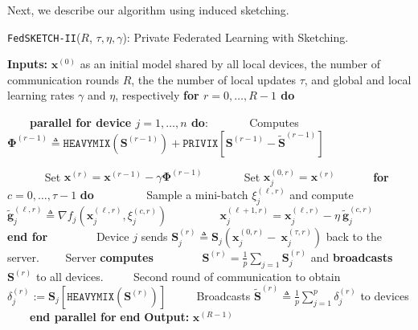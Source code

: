 Next, we describe our algorithm using induced sketching.






\begin{algorithm}[H]
\caption{\texttt{FedSKETCH-II}($R$, $\tau, \eta, \gamma$): Private Federated Learning with Sketching. }\label{Alg:PFLHom}
\begin{algorithmic}[1]
\State \textbf{Inputs:} $\boldsymbol{x}^{(0)}$ as an initial  model shared by all local devices, the number of communication rounds $R$, the the number of local updates $\tau$, and global and local learning rates $\gamma$ and $\eta$, respectively
\State \textbf{for $r=0, \ldots, R-1$ do}

\State $\qquad$\textbf{parallel for device $j=1,\ldots,n$ do}:
\State $\qquad\quad$ Computes ${\mathbf{\Phi}}^{(r-1)}\triangleq \texttt{HEAVYMIX}(\mathbf{S}^{(r-1)})+\texttt{PRIVIX}\left[{\mathbf{S}}^{(r-1)}- \tilde{\mathbf{S}}^{(r-1)}\right]$


\State $\qquad\quad$ Set $\boldsymbol{x}^{(r)}=\boldsymbol{x}^{(r-1)}-\gamma{\mathbf{\Phi}}^{(r-1)}$
\State $\qquad\quad$ Set $\boldsymbol{x}_j^{(0,r)}=\boldsymbol{x}^{(r)}$ 
\State $\qquad\quad $\textbf{for} $c=0,\ldots,\tau-1$ \textbf{do}
\State $\qquad\quad\quad$ Sample a mini-batch $\xi_j^{(\ell,r)}$ and compute $\tilde{\mathbf{g}}_{j}^{(\ell,r)}\triangleq\nabla{f}_j(\boldsymbol{x}^{(\ell,r)}_j,\xi_j^{(c,r)})$
\State $\qquad\quad\quad$ $\boldsymbol{x}^{(\ell+1,r)}_{j}=\boldsymbol{x}^{(\ell,r)}_j-\eta~ \tilde{\mathbf{g}}_{j}^{(c,r)}$ \label{eq:update-rule-alg}
\State $\qquad\quad$\textbf{end for}
\State $\qquad\quad\quad$Device $j$ sends $\mathbf{S}^{(r)}_{j}\triangleq\mathbf{S}_{j}\left(\boldsymbol{x}_j^{(0,r)}-~{\boldsymbol{x}}_{j}^{(\tau,r)}\right)$ back to the server.
\State $\qquad$Server \textbf{computes} 
\State $\qquad\qquad {\mathbf{S}}^{(r)}=\frac{1}{p}\sum_{j=1}\mathbf{S}^{(r)}_{j}$ and \textbf{broadcasts} ${\mathbf{S}}^{(r)}$ to all devices.
\State $\qquad$ Second round of communication to obtain $\delta_j^{(r)} :=  \mathbf{S}_j\left[\texttt{HEAVYMIX}(\mathbf{S}^{(r)})\right]$ 
\State $\qquad$ Broadcasts $\tilde{\mathbf{S}}^{(r)}\triangleq\frac{1}{p}\sum_{j=1}^p\delta_j^{(r)}$ to devices
\State $\qquad$\textbf{end parallel for}
\State \textbf{end}
\State \textbf{Output:} ${\boldsymbol{x}}^{(R-1)}$
\vspace{- 0.1cm}
\end{algorithmic}
\end{algorithm}


